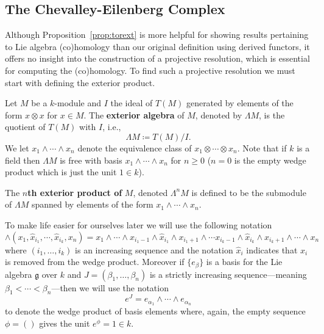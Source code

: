 \subsection{The Chevalley-Eilenberg Complex} %
\label{sub:The Chevalley-Eilenberg Complex}
Although Proposition~\ref{prop:torext} is more helpful for showing results pertaining to Lie algebra (co)homology than our original definition using derived functors, it offers no insight into the construction of a projective resolution, which is essential for computing the (co)homology. To find such a projective resolution we must start with defining the exterior product.

\begin{definition}
  Let $ M $ be a $ k $-module and $ I $ the ideal of $ T(M) $ generated by elements of the form $ x \otimes x $ for $ x \in M $. The \textbf{exterior algebra} of $ M $, denoted by $ \Lambda M $, is the quotient of $ T(M) $ with $ I $, i.e.,
  \begin{equation}
    \Lambda M\coloneqq T(M)/I.
  \end{equation}
  We let $ x_1 \wedge \cdots \wedge x_n $ denote the equivalence class of $ x_1 \otimes \cdots \otimes x_n $. Note that if $ k $ is a field then $ \Lambda M $ is free with basis $ x_1 \wedge \cdots \wedge x_n $ for $ n\geq 0 $ ($ n = 0 $ is the empty wedge product which is just the unit $ 1 \in k $).

  The $ n $\textbf{th exterior product of} $ M $, denoted $ \Lambda^{n}M $ is defined to be the submodule of $ \Lambda M $ spanned by elements of the form $ x_1 \wedge \cdots \wedge x_n $.
\end{definition}
To make life easier for ourselves later we will use the following notation
\begin{equation}
  \wedge(x_1, \widehat{x}_{i_1}, \cdots, \widehat{x}_{i_k}, x_n) =  x_1 \wedge \cdots \wedge x_{i_1 - 1} \wedge \widehat{x}_{i_1} \wedge x_{i_1 + 1} \wedge \cdots x_{i_k - 1} \wedge \widehat{x}_{i_{k}} \wedge x_{i_{k} + 1} \wedge \cdots \wedge x_{n}
\end{equation}
where $ (i_1, \ldots, i_k) $ is an increasing sequence and the notation $ \widehat{x}_i $ indicates that $ x_i $ is removed from the wedge product. Moreover if $ \{e_{\beta}\} $ is a basis for the Lie algebra $ \mathfrak{g} $ over $ k $ and $ J = (\beta_1, \ldots, \beta_n) $ is a strictly increasing sequence---meaning $ \beta_1 < \cdots < \beta_n $---then we will use the notation
\begin{equation}
  e^{J} = e_{\alpha_1} \wedge \cdots \wedge e_{\alpha_n}
\end{equation}
to denote the wedge product of basis elements where, again, the empty sequence $ \phi = () $ gives the unit $ e^{\phi} = 1 \in k $.

